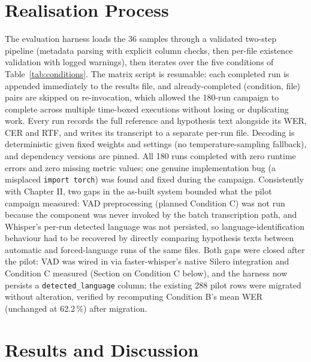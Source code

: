 \documentclass[12pt]{report}
\begin{document}
\section{Realisation Process}
The evaluation harness loads the 36 samples through a validated two-step pipeline (metadata parsing with explicit column checks, then per-file existence validation with logged warnings), then iterates over the five conditions of Table~\ref{tab:conditions}. The matrix script is resumable: each completed run is appended immediately to the results file, and already-completed (condition, file) pairs are skipped on re-invocation, which allowed the 180-run campaign to complete across multiple time-boxed executions without losing or duplicating work. Every run records the full reference and hypothesis text alongside its WER, CER and RTF, and writes its transcript to a separate per-run file. Decoding is deterministic given fixed weights and settings (no temperature-sampling fallback), and dependency versions are pinned. All 180 runs completed with zero runtime errors and zero missing metric values; one genuine implementation bug (a misplaced \texttt{import torch}) was found and fixed during the campaign.
Consistently with Chapter II, two gaps in the as-built system bounded what the pilot campaign measured: VAD preprocessing (planned Condition C) was not run because the component was never invoked by the batch transcription path, and Whisper's per-run detected language was not persisted, so language-identification behaviour had to be recovered by directly comparing hypothesis texts between automatic and forced-language runs of the same files. Both gaps were closed after the pilot: VAD was wired in via faster-whisper's native Silero integration and Condition C measured (Section on Condition C below), and the harness now persists a \texttt{detected\_language} column; the existing 288 pilot rows were migrated without alteration, verified by recomputing Condition B's mean WER (unchanged at 62.2\,\%) after migration.
\section{Results and Discussion}
\end{document}
